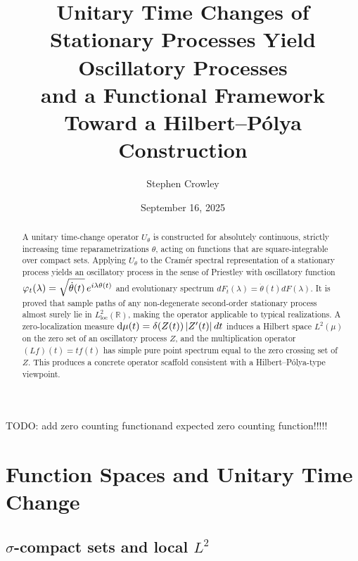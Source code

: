 \documentclass{article}
\newcommand{\mathd}{\mathrm{d}}
\newcommand{\tmop}[1]{\ensuremath{\operatorname{#1}}}
\begin{document}
\title{
  Unitary Time Changes of Stationary Processes Yield Oscillatory Processes\\
  and a Functional Framework Toward a Hilbert--P{\'o}lya Construction
}

\author{Stephen Crowley}

\date{September 16, 2025}

\maketitle

\begin{abstract}
  A unitary time-change operator $U_{\theta}$ is constructed for absolutely
  continuous, strictly increasing time reparametrizations $\theta$, acting on
  functions that are square-integrable over compact sets. Applying
  $U_{\theta}$ to the Cram{\'e}r spectral representation of a stationary
  process yields an oscillatory process in the sense of Priestley with
  oscillatory function $\varphi_t (\lambda) = \sqrt{\dot{\theta} (t)} 
  \hspace{0.17em} e^{i \lambda \theta (t)}$ and evolutionary spectrum $dF_t
  (\lambda) = \dot{\theta} (t) dF (\lambda)$. It is proved that sample paths
  of any non-degenerate second-order stationary process almost surely lie in
  $L^2_{\tmop{loc}} (\mathbb{R})$, making the operator applicable to typical
  realizations. A zero-localization measure $\mathd \mu (t) = \delta (Z (t))
  \hspace{0.17em} |Z' (t) |  \hspace{0.17em} dt$ induces a Hilbert space $L^2
  (\mu)$ on the zero set of an oscillatory process $Z$, and the multiplication
  operator $(Lf) (t) = tf (t)$ has simple pure point spectrum equal to the
  zero crossing set of $Z$. This produces a concrete operator scaffold
  consistent with a Hilbert--P{\'o}lya-type viewpoint.
\end{abstract}

{\tableofcontents}

TODO: add zero counting function\quad and expected zero counting function!!!!!

\section{Function Spaces and Unitary Time Change}\label{sec:functionspaces}

\subsection{$\sigma$-compact sets and local $L^2$}
\end{document}
